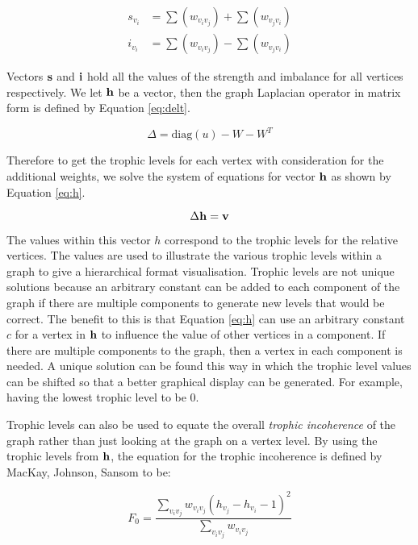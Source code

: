 \begin{align}
s_{v_i} &= \sum(w_{v_iv_j}) + \sum(w_{v_jv_i}) \label{eq:strength} \\
i_{v_i} &= \sum(w_{v_iv_j}) - \sum(w_{v_jv_i}) \label{eq:imb}
\end{align}

Vectors $\bold{s}$ and $\bold{i}$ hold all the values of the strength and imbalance for all vertices respectively. We let $\bold{h}$ be a vector, then the graph Laplacian operator in matrix form is defined by Equation \ref{eq:delt}.  

\begin{equation} \label{eq:delt}
\Delta = \text{diag}(u) - W - W^T
\end{equation}

Therefore to get the trophic levels for each vertex with consideration for the additional weights, we solve the system of equations for vector $\bold{h}$ as shown by Equation \ref{eq:h}.

\begin{equation} \label{eq:h}
\Delta \bold{h} = \bold{v} 
\end{equation}

The values within this vector $h$ correspond to the trophic levels for the relative vertices. The values are used to illustrate the various trophic levels within a graph to give a hierarchical format visualisation. Trophic levels are not unique solutions because an arbitrary constant can be added to each component of the graph if there are multiple components to generate new levels that would be correct. The benefit to this is that Equation \ref{eq:h} can use an arbitrary constant $c$ for a vertex in $\bold{h}$ to influence the value of other vertices in a component. If there are multiple components to the graph, then a vertex in each component is needed. A unique solution can be found this way in which the trophic level values can be shifted so that a better graphical display can be generated. For example, having the lowest trophic level to be 0. 

Trophic levels can also be used to equate the overall \emph{trophic incoherence} of the graph rather than just looking at the graph on a vertex level. By using the trophic levels from $\bold{h}$, the equation for the trophic incoherence is defined by MacKay, Johnson, Sansom \cite{johnson2020digraphs} to be:

\begin{equation}
F_0=\frac{\sum_{v_iv_j}w_{v_iv_j}(h_{v_j}-h_{v_i}-1)^2}{\sum_{v_iv_j}w_{v_iv_j}}
\end{equation}

